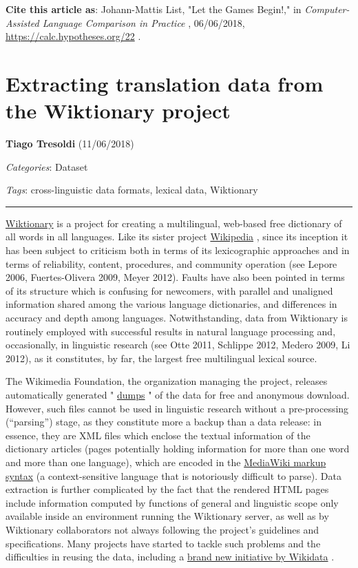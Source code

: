 \documentclass[
  english,
  a4paper,
  oneside,tablecaptionabove
]{scrbook}
\begin{document}
\textbf{Cite this article as}: Johann-Mattis List, "Let the Games
Begin!," in \emph{Computer-Assisted Language Comparison in Practice} ,
06/06/2018, \url{https://calc.hypotheses.org/22} .

\hypertarget{extracting-translation-data-from-the-wiktionary-project}{%
\chapter{Extracting translation data from the Wiktionary
project}\label{extracting-translation-data-from-the-wiktionary-project}}

\textbf{Tiago Tresoldi} (11/06/2018)

\emph{Categories}: Dataset

\emph{Tags}: cross-linguistic data formats, lexical data, Wiktionary

\begin{center}\rule{0.5\linewidth}{\linethickness}\end{center}

\href{https://wiktionary.org}{Wiktionary} is a project for creating a
multilingual, web-based free dictionary of all words in all languages.
Like its sister project \href{https://wikipedia.org}{Wikipedia} , since
its inception it has been subject to criticism both in terms of its
lexicographic approaches and in terms of reliability, content,
procedures, and community operation (see Lepore 2006, Fuertes-Olivera
2009, Meyer 2012). Faults have also been pointed in terms of its
structure which is confusing for newcomers, with parallel and unaligned
information shared among the various language dictionaries, and
differences in accuracy and depth among languages. Notwithstanding, data
from Wiktionary is routinely employed with successful results in natural
language processing and, occasionally, in linguistic research (see Otte
2011, Schlippe 2012, Medero 2009, Li 2012), as it constitutes, by far,
the largest free multilingual lexical source.

The Wikimedia Foundation, the organization managing the project,
releases automatically generated "
\href{https://dumps.wikimedia.org/}{dumps} " of the data for free and
anonymous download. However, such files cannot be used in linguistic
research without a pre-processing (\enquote{parsing}) stage, as they
constitute more a backup than a data release: in essence, they are XML
files which enclose the textual information of the dictionary articles
(pages potentially holding information for more than one word and more
than one language), which are encoded in the
\href{https://www.mediawiki.org/wiki/Markup_spec}{MediaWiki markup
syntax} (a context-sensitive language that is notoriously difficult to
parse). Data extraction is further complicated by the fact that the
rendered HTML pages include information computed by functions of general
and linguistic scope only available inside an environment running the
Wiktionary server, as well as by Wiktionary collaborators not always
following the project's guidelines and specifications. Many projects
have started to tackle such problems and the difficulties in reusing the
data, including a
\href{https://www.wikidata.org/wiki/Wikidata:Lexicographical_data}{brand
new initiative by Wikidata} .
\end{document}
